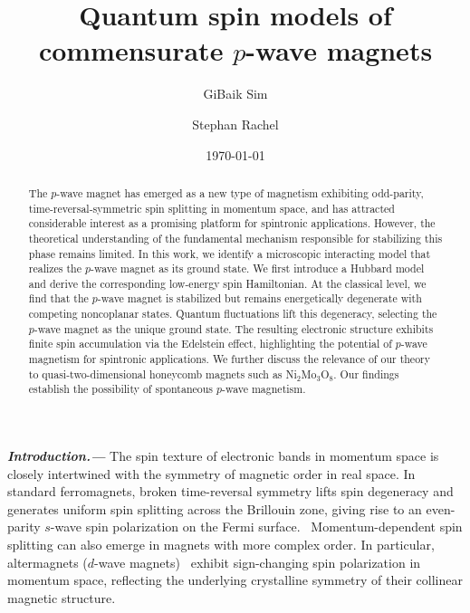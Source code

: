 \documentclass[aps,prl,twocolumn,showpacs,superscriptaddress]{revtex4-2}
\begin{document}
\title{Quantum spin models of commensurate $p$-wave magnets}

\author{GiBaik Sim}

\author{Stephan Rachel}

\date{\today}
\begin{abstract}
The $p$-wave magnet has emerged as a new type of magnetism exhibiting odd-parity, time-reversal-symmetric spin splitting in momentum space, and has attracted considerable interest as a promising platform for spintronic applications. However, the theoretical understanding of the fundamental mechanism responsible for stabilizing this phase remains limited. In this work, we identify a microscopic interacting model that realizes the $p$-wave magnet as its ground state. We first introduce a Hubbard model and derive the corresponding low-energy spin Hamiltonian. At the classical level, we find that the $p$-wave magnet is stabilized but remains energetically degenerate with competing noncoplanar states. Quantum fluctuations lift this degeneracy, selecting the $p$-wave magnet as the unique ground state. The resulting electronic structure exhibits finite spin accumulation via the Edelstein effect, highlighting the potential of $p$-wave magnetism for spintronic applications. We further discuss the relevance of our theory to quasi-two-dimensional honeycomb magnets such as Ni$_2$Mo$_3$O$_8$. Our findings establish the possibility of spontaneous $p$-wave magnetism.
\end{abstract}

\maketitle

\textbf{\textit{Introduction.---}} The spin texture of electronic bands in momentum space is closely intertwined with the symmetry of magnetic order in real space.\cite{moriya2012spin,vzutic2004spintronics,hayami2018classification,jungwirth2025altermagnetism} In standard ferromagnets, broken time-reversal symmetry lifts spin degeneracy and generates uniform spin splitting across the Brillouin zone, giving rise to an even-parity $s$-wave spin polarization on the Fermi surface.~\cite{katsnelson2008half} Momentum-dependent spin splitting can also emerge in magnets with more complex order. In particular, altermagnets ($d$-wave magnets)~\cite{ahn2019antiferromagnetism,hayami2020bottom,yuan2020giant,vsmejkal2022beyond,vsmejkal2022emerging,leeb2024spontaneous,li2025exploring,PhysRevLett.132.176702,kaushal2025altermagnetism,durrnagel2025altermagnetic,kaushal2026spontaneous} exhibit sign-changing spin polarization in momentum space, reflecting the underlying crystalline symmetry of their collinear magnetic structure.~\cite{vsmejkal2022anomalous,song2025altermagnets,bai2024altermagnetism,liu2025altermagnetism}
\end{document}
